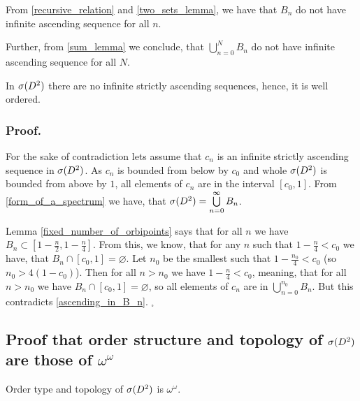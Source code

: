 \begin{observation}\label{ascending_in_B_n}
From \ref{recursive_relation} and \ref{two_sets_lemma}, we have that $B_n$ do not have 
infinite ascending sequence for all $n$. 

Further, from \ref{sum_lemma} we conclude, 
that $\bigcup\limits_{n=0}^N B_n$ do not have infinite ascending sequence for all $N$.
\end{observation}

\begin{theorem}\label{well_order}
In ${{\sigma}(D^2)}$ there are no infinite strictly ascending sequences, hence, it is well ordered.
\end{theorem}
\subsubsection{Proof.}
For the sake of contradiction lets assume that $c_n$ is an infinite strictly ascending sequence in 
${{\sigma}(D^2)}$. As $c_n$ is bounded from below by $c_0$ and whole ${{\sigma}(D^2)}$ is bounded from above 
by $1$, all elements of $c_n$ are in the interval $[c_0, 1]$. 
From \ref{form_of_a_spectrum} we have, that ${{\sigma}(D^2)} = \bigcup\limits^\infty_{n=0}B_n$. 

Lemma 
\ref{fixed_number_of_orbipoints} says that for all $n$ we
have $B_n \subset [1-\frac{n}{2}, 1 - \frac{n}{4}]$. From this, we know, that for any 
$n$ such that $1 - \frac{n}{4} < c_0$ 
we have, that $B_n \cap [c_0,1] = \varnothing $. Let $n_0$ be the smallest such that 
$1 - \frac{n_0}{4} < c_0$ (so $n_0 > 4(1-c_0)$). 
Then for all $n > n_0$ we have $1 - \frac{n}{4} < c_0$, meaning, that 
for all $n > n_0$ we have
$B_n \cap [c_0,1] = \varnothing $, so all elements of $c_n$ are in 
$\bigcup\limits_{n=0}^{n_0} B_n$.
But this contradicts \ref{ascending_in_B_n}.  $_\square$









\subsection{Proof that order structure and topology of ${{\sigma}(D^2)}$ are those of $\omega^\omega$}
\begin{theorem}\label{speD_order_type}
Order type and topology of ${{\sigma}(D^2)}$ is $\omega^\omega$. 
\end{theorem}
